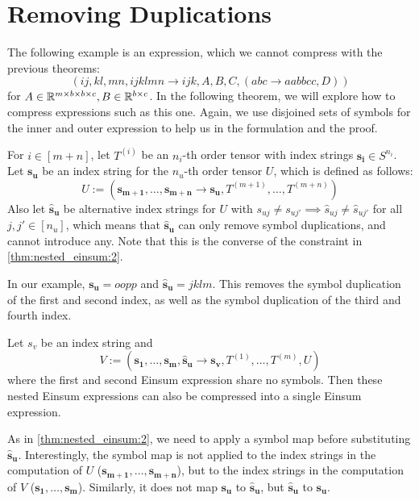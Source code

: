 \section{Removing Duplications}

The following example is an expression, which we cannot compress with the previous theorems:
$$(ij, kl, mn, ijklmn \rightarrow ijk, A, B, C, (abc \rightarrow aabbcc, D))$$
for $A \in \mathbb{R}^{m \times b \times b \times c}, B \in \mathbb{R}^{b \times c}$.
In the following theorem, we will explore how to compress expressions such as this one.
Again, we use disjoined sets of symbols for the inner and outer expression to help us in the formulation and the proof.

\begin{theorem}
    \label{thm:nested_einsum:3}

    For $i \in [m + n]$, let $T^{(i)}$ be an $n_i$-th order tensor with index strings $\bm{s_i} \in S^{n_i}$.
    Let $\bm{s_u}$ be an index string for the $n_u$-th order tensor $U$, which is defined as follows:
    $$U := (\bm{s_{m + 1}},\dots,\bm{s_{m + n}} \rightarrow \bm{s_u}, T^{(m + 1)},\dots,T^{(m + n)})$$
    Also let $\bm{\hat{s}_u}$ be alternative index strings for $U$ with $s_{uj} \neq s_{uj'} \implies \hat{s}_{uj} \neq \hat{s}_{uj'}$ for all $j, j' \in [n_u]$,
    which means that $\bm{\hat{s}_u}$ can only remove symbol duplications, and cannot introduce any.
    Note that this is the converse of the constraint in \autoref{thm:nested_einsum:2}.

    In our example, $\bm{s_u} = oopp$ and $\bm{\hat{s}_u} = jklm$.
    This removes the symbol duplication of the first and second index, as well as the symbol duplication of the third and fourth index.

    Let $s_v$ be an index string and
    $$V := (\bm{s_1},\dots,\bm{s_m}, \bm{\hat{s}_u} \rightarrow \bm{s_v}, T^{(1)},\dots,T^{(m)}, U)$$
    where the first and second Einsum expression share no symbols.
    Then these nested Einsum expressions can also be compressed into a single Einsum expression.

    As in \autoref{thm:nested_einsum:2}, we need to apply a symbol map before substituting $\bm{\hat{s}_u}$.
    Interestingly, the symbol map is not applied to the index strings in the computation of $U$ ($\bm{s_{m + 1}},\dots,\bm{s_{m + n}}$),
    but to the index strings in the computation of $V$ ($\bm{s_1},\dots,\bm{s_m}$).
    Similarly, it does not map $\bm{s_u}$ to $\bm{\hat{s}_u}$, but $\bm{\hat{s}_u}$ to $\bm{s_u}$.


\end{theorem}
